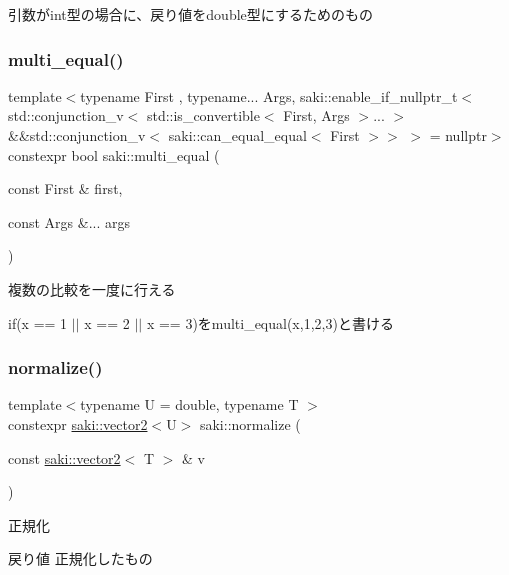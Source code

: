 引数がint型の場合に、戻り値をdouble型にするためのもの 

\mbox{\label{namespacesaki_a098cd355949dd93ffdaf620f0fc7e236}} 
\subsubsection{\texorpdfstring{multi\+\_\+equal()}{multi\_equal()}}
{\footnotesize\ttfamily template$<$typename First , typename... Args, saki\+::enable\+\_\+if\+\_\+nullptr\+\_\+t$<$ std\+::conjunction\+\_\+v$<$ std\+::is\+\_\+convertible$<$ First, Args $>$... $>$ \&\&std\+::conjunction\+\_\+v$<$ saki\+::can\+\_\+equal\+\_\+equal$<$ First $>$$>$ $>$  = nullptr$>$ \\
constexpr bool saki\+::multi\+\_\+equal (\begin{DoxyParamCaption}\item[{const First \&}]{first,  }\item[{const Args \&...}]{args }\end{DoxyParamCaption})}



複数の比較を一度に行える 

if(x == 1 $\vert$$\vert$ x == 2 $\vert$$\vert$ x == 3)をmulti\+\_\+equal(x,1,2,3)と書ける \mbox{\label{namespacesaki_a0ca208fb45c585d9cd23276fb91e40ee}} 
\subsubsection{\texorpdfstring{normalize()}{normalize()}\hspace{0.1cm}{\footnotesize\ttfamily [1/3]}}
{\footnotesize\ttfamily template$<$typename U  = double, typename T $>$ \\
constexpr \mbox{\hyperlink{classsaki_1_1vector2}{saki\+::vector2}}$<$U$>$ saki\+::normalize (\begin{DoxyParamCaption}\item[{const \mbox{\hyperlink{classsaki_1_1vector2}{saki\+::vector2}}$<$ T $>$ \&}]{v }\end{DoxyParamCaption})}



正規化 

\begin{DoxyReturn}{戻り値}
正規化したもの 
\end{DoxyReturn}
\mbox{\label{namespacesaki_aa38ed490dc1e7d5df7241eefd1c9453b}} 
